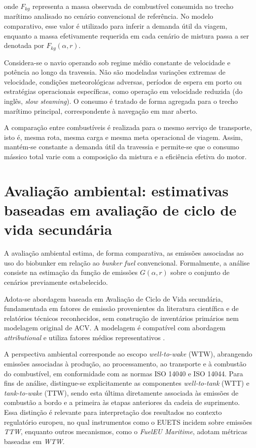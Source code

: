 onde $F_{kg}$ representa a massa observada de combustível consumida no trecho marítimo analisado no cenário convencional de referência. No modelo comparativo, esse valor é utilizado para inferir a demanda útil da viagem, enquanto a massa efetivamente requerida em cada cenário de mistura passa a ser denotada por $F_{kg}(\alpha,r)$.

Considera-se o navio operando sob regime médio constante de velocidade e potência ao longo da travessia. Não são modeladas variações extremas de velocidade, condições meteorológicas adversas, períodos de espera em porto ou estratégias operacionais específicas, como operação em velocidade reduzida (do inglês, \emph{slow steaming}). O consumo é tratado de forma agregada para o trecho marítimo principal, correspondente à navegação em mar aberto.

A comparação entre combustíveis é realizada para o mesmo serviço de transporte, isto é, mesma rota, mesma carga e mesma meta operacional de viagem. Assim, mantém-se constante a demanda útil da travessia e permite-se que o consumo mássico total varie com a composição da mistura e a eficiência efetiva do motor.

\section{Avaliação ambiental: estimativas baseadas em avaliação de ciclo de vida secundária}

A avaliação ambiental estima, de forma comparativa, as emissões associadas ao uso do biobunker em relação ao \emph{bunker fuel} convencional. Formalmente, a análise consiste na estimação da função de emissões $G(\alpha,r)$ sobre o conjunto de cenários previamente estabelecido.

Adota-se abordagem baseada em Avaliação de Ciclo de Vida secundária, fundamentada em fatores de emissão provenientes da literatura científica e de relatórios técnicos reconhecidos, sem construção de inventários primários nem modelagem original de \gls{ACV}. A modelagem é compatível com abordagem \emph{attributional} e utiliza fatores médios representativos \citep{intergovernmental_panel_on_climate_change_2006_2006,intergovernmental_panel_on_climate_change_2019_2019}.

A perspectiva ambiental corresponde ao escopo \emph{well-to-wake} (\gls{WTW}), abrangendo emissões associadas à produção, ao processamento, ao transporte e à combustão do combustível, em conformidade com as normas \gls{ISO} 14040 e \gls{ISO} 14044. Para fins de análise, distingue-se explicitamente as componentes \emph{well-to-tank} (\gls{WTT}) e \emph{tank-to-wake} (\gls{TTW}), sendo esta última diretamente associada às emissões de combustão a bordo e a primeira às etapas anteriores da cadeia de suprimento. Essa distinção é relevante para interpretação dos resultados no contexto regulatório europeu, no qual instrumentos como o \gls{EUETS} incidem sobre emissões \emph{TTW}, enquanto outros mecanismos, como o \emph{FuelEU Maritime}, adotam métricas baseadas em \emph{WTW}.

